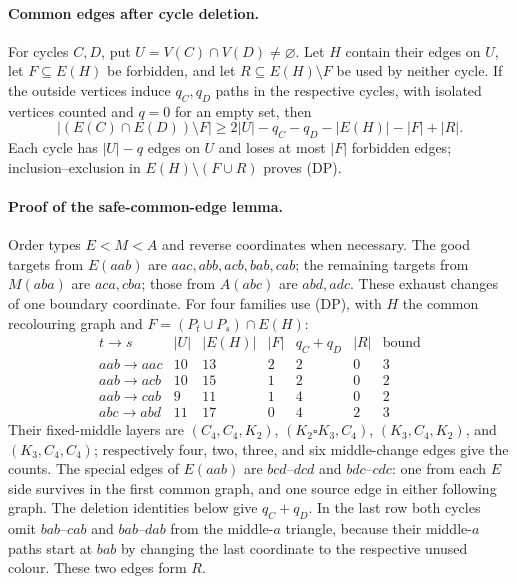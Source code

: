 \paragraph{Common edges after cycle deletion.}
For cycles $C,D$, put $U=V(C)\cap V(D)\ne\varnothing$. Let $H$
contain their edges on $U$, let $F\subseteq E(H)$ be forbidden, and
let $R\subseteq E(H)\setminus F$ be used by neither cycle.
If the outside vertices induce $q_C,q_D$ paths in the respective
cycles, with isolated vertices counted and $q=0$ for an empty set, then
\[
 |(E(C)\cap E(D))\setminus F|
 \ge 2|U|-q_C-q_D-|E(H)|-|F|+|R|.                  \tag{DP}
\]
Each cycle has $|U|-q$ edges on $U$ and loses at most $|F|$ forbidden
edges; inclusion--exclusion in $E(H)\setminus(F\cup R)$ proves (DP).

\paragraph{Proof of the safe-common-edge lemma.}
Order types $E<M<A$ and reverse coordinates when necessary. The
good targets from $E(aab)$ are $aac,abb,acb,bab,cab$; the remaining
targets from $M(aba)$ are $aca,cba$; those from $A(abc)$ are $abd,adc$.
These exhaust changes of one boundary coordinate.
For four families use (DP), with $H$ the common recolouring graph
and $F=(P_t\cup P_s)\cap E(H)$:
\[
\begin{array}{c|rrrrr|r}
t\to s&|U|&|E(H)|&|F|&q_C+q_D&|R|&\text{bound}\\\hline
aab\to aac&10&13&2&2&0&3\\
aab\to acb&10&15&1&2&0&2\\
aab\to cab&9&11&1&4&0&2\\
abc\to abd&11&17&0&4&2&3
\end{array}                                                     \tag{CT}
\]
Their fixed-middle layers are $(C_4,C_4,K_2)$,
$(K_2\square K_3,C_4)$, $(K_3,C_4,K_2)$, and $(K_3,C_4,C_4)$;
respectively four, two, three, and six middle-change edges give the
counts. The special edges of $E(aab)$ are $bcd$--$dcd$ and
$bdc$--$cdc$: one from each $E$ side survives in the first common
graph, and one source edge in either following graph. The deletion
identities below give $q_C+q_D$. In the last row both cycles omit
$bab$--$cab$ and $bab$--$dab$ from the middle-$a$ triangle, because
their middle-$a$ paths start at $bab$ by changing the last coordinate
to the respective unused colour. These two edges form $R$.

